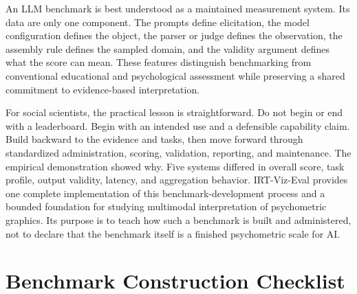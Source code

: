 \documentclass[12pt]{article}
\newif\ifprintappendix
\begin{document}
An LLM benchmark is best understood as a maintained measurement system. Its data are only one component. The prompts define elicitation, the model configuration defines the object, the parser or judge defines the observation, the assembly rule defines the sampled domain, and the validity argument defines what the score can mean. These features distinguish benchmarking from conventional educational and psychological assessment while preserving a shared commitment to evidence-based interpretation.

For social scientists, the practical lesson is straightforward. Do not begin or end with a leaderboard. Begin with an intended use and a defensible capability claim. Build backward to the evidence and tasks, then move forward through standardized administration, scoring, validation, reporting, and maintenance. The empirical demonstration showed why. Five systems differed in overall score, task profile, output validity, latency, and aggregation behavior. IRT-Viz-Eval provides one complete implementation of this benchmark-development process and a bounded foundation for studying multimodal interpretation of psychometric graphics. Its purpose is to teach how such a benchmark is built and administered, not to declare that the benchmark itself is a finished psychometric scale for AI.

\ifprintappendix
\clearpage
\appendix

\section{Benchmark Construction Checklist}
\end{document}
